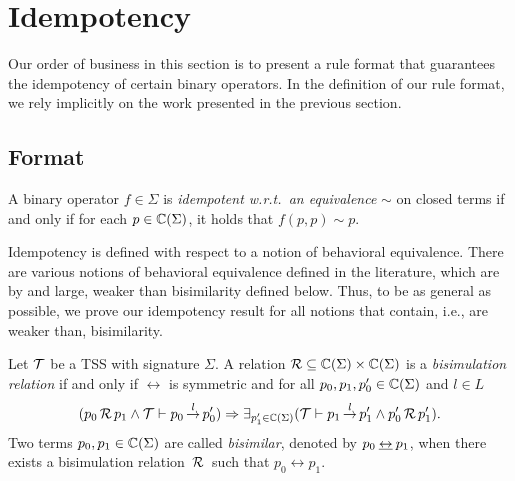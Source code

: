 \section{\label{sec:idempotency}Idempotency}
Our order of business in this section is to present a rule format
that guarantees the idempotency of certain binary operators.
In the definition of our rule format, we rely implicitly on the work presented in the previous section.


\subsection{Format}

\begin{definition}[Idempotency]
\label{def:idem}
A binary operator $f \in \Sigma$ is \emph{idempotent w.r.t.\ an equivalence} $\sim$ on closed terms if and only if  for each $p \in \mathbb{C}(\Sigma)$, it holds that $f(p,p) \sim p$.
\end{definition}

Idempotency is  defined with respect to a notion of behavioral equivalence.
There are various notions of behavioral equivalence defined in the literature,
which are by and large, weaker than bisimilarity defined below.
Thus, to be as general as possible, we prove our idempotency result
for all notions that contain, i.e., are weaker than, bisimilarity.


\begin{definition}[Bisimulation]
\label{def:bisim}
Let $\mathcal{T}$ be a TSS with signature $\Sigma$.
A relation $\mathcal{R} \subseteq \mathbb{C}(\Sigma) \times \mathbb{C}(\Sigma)$ is a \emph{bisimulation relation}
if and only if $\rel$ is symmetric
and for all $p_0,p_1,p'_0 \in \mathbb{C}(\Sigma)$ and $l \in L$
$$(p_0 \,\mathcal{R}\, p_1 \wedge \mathcal{T} \vdash p_0 \,{\stackrel{{l}}{\rightarrow}}\, p_0') \Rightarrow \exists_{p_1' \in \mathbb{C}(\Sigma)} (\mathcal{T} \vdash p_1 \,{\stackrel{{l}}{\rightarrow}}\, p_1'\wedge p_0' \,\mathcal{R}\, p_1' ).$$
Two terms $p_0, p_1 \in \mathbb{C}(\Sigma)$ are called \emph{bisimilar}, denoted by $p_0 \mathbin{\mbox{$\underline{\leftrightarrow}$}} p_1$, when there exists a bisimulation relation $\,\mathcal{R}\,$ such that
$p_0 \rel p_1$.
\end{definition}


